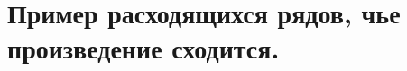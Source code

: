 \documentclass[../main.tex]{subfiles}
\begin{document}
\newpage
\section{Пример расходящихся рядов, чье произведение сходится.}
\end{document}

